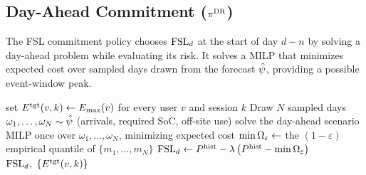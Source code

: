 







\subsection{Day-Ahead Commitment ($\pidr$)}\label{sec:approach-dr}



The FSL commitment policy chooses $\mathrm{FSL}_d$ at the start of day $d{-}n$ by solving a day-ahead problem while evaluating its risk. It solves a MILP that minimizes expected cost over sampled days drawn from the forecast $\hat{\psi}$, providing a possible event-window peak. 

\begin{algorithm}[t]
\caption{$\pidr$: day-ahead commitment by scenario MILP}
\label{alg:dr}
\DontPrintSemicolon
{}
set $E^{\mathrm{tgt}}(v,k) \leftarrow E_{\max}(v)$ for every user $v$ and session $k$
Draw $N$ sampled days $\omega_1,\dots,\omega_N \sim \hat{\psi}$ (arrivals,
required SoC, off-site use)\;
solve the day-ahead scenario MILP once over $\omega_1,\dots,\omega_N$,
minimizing expected cost 
$\min\Omega_{\varepsilon} \leftarrow$ the $(1-\varepsilon)$ empirical quantile of
$\{m_1,\dots,m_N\}$ 
$\mathrm{FSL}_d \leftarrow P^{\mathrm{hist}} - \lambda\,\bigl(P^{\mathrm{hist}} - \min \Omega_{\varepsilon}\bigr)$
\Return $\mathrm{FSL}_d,\ \{E^{\mathrm{tgt}}(v,k)\}$\;
\end{algorithm}


